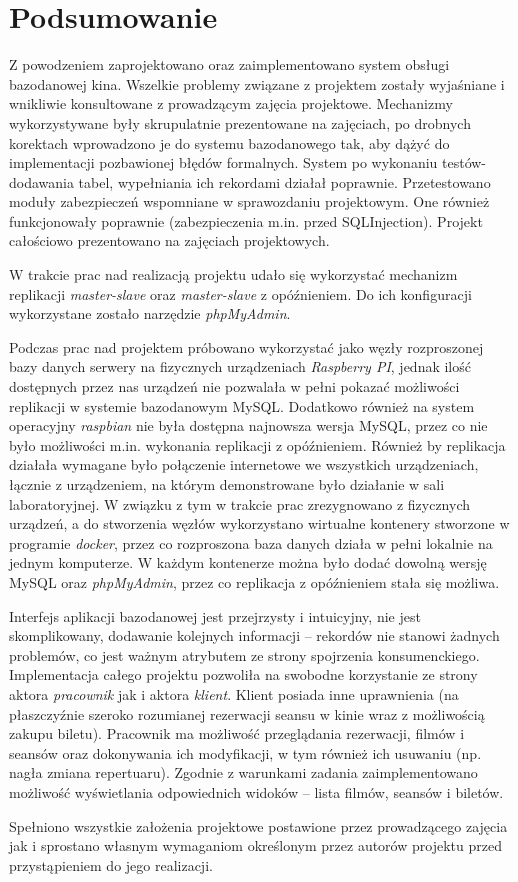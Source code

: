\chapter{Podsumowanie}

Z powodzeniem zaprojektowano oraz zaimplementowano system obsługi bazodanowej kina.
Wszelkie problemy związane z projektem zostały wyjaśniane i wnikliwie konsultowane z prowadzącym
zajęcia projektowe. Mechanizmy wykorzystywane były skrupulatnie prezentowane na zajęciach,
po drobnych korektach wprowadzono je do systemu bazodanowego tak, aby dążyć do
implementacji pozbawionej błędów formalnych.
System po wykonaniu testów- dodawania tabel, wypełniania ich rekordami działał poprawnie.
Przetestowano moduły zabezpieczeń wspomniane w sprawozdaniu projektowym. One również
funkcjonowały poprawnie (zabezpieczenia m.in. przed SQLInjection). Projekt całościowo prezentowano na zajęciach projektowych.

W trakcie prac nad realizacją projektu udało się wykorzystać mechanizm replikacji \textit{master-slave} oraz \textit{master-slave} z opóźnieniem. Do ich konfiguracji wykorzystane zostało narzędzie \textit{phpMyAdmin}. 

Podczas prac nad projektem próbowano wykorzystać jako węzły rozproszonej bazy danych serwery na fizycznych urządzeniach \textit{Raspberry PI}, jednak ilość dostępnych przez nas urządzeń nie pozwalała w pełni pokazać możliwości replikacji w systemie bazodanowym MySQL. Dodatkowo również na system operacyjny \textit{raspbian} nie była dostępna najnowsza wersja MySQL, przez co nie było możliwości m.in. wykonania replikacji z opóźnieniem. Również by replikacja działała wymagane było połączenie internetowe we wszystkich urządzeniach, łącznie z urządzeniem, na którym demonstrowane było działanie w sali laboratoryjnej. W związku z tym w trakcie prac zrezygnowano z fizycznych urządzeń, a do stworzenia węzłów wykorzystano wirtualne kontenery stworzone w programie \textit{docker}, przez co rozproszona baza danych działa w pełni lokalnie na jednym komputerze. W każdym kontenerze można było dodać dowolną wersję MySQL oraz \textit{phpMyAdmin}, przez co replikacja z opóźnieniem stała się możliwa.


Interfejs aplikacji bazodanowej jest przejrzysty i intuicyjny, nie jest skomplikowany, dodawanie kolejnych informacji – rekordów nie stanowi żadnych problemów, co jest ważnym atrybutem ze strony spojrzenia konsumenckiego. Implementacja całego projektu pozwoliła na swobodne korzystanie ze strony aktora \textit{pracownik} jak i aktora \textit{klient}. Klient posiada inne uprawnienia (na płaszczyźnie szeroko rozumianej rezerwacji seansu w kinie wraz z możliwością zakupu biletu). Pracownik ma możliwość przeglądania rezerwacji, filmów i seansów oraz dokonywania ich modyfikacji, w tym również ich usuwaniu (np. nagła zmiana repertuaru). Zgodnie z warunkami zadania zaimplementowano możliwość wyświetlania odpowiednich widoków – lista filmów, seansów i biletów.

Spełniono wszystkie założenia projektowe postawione przez prowadzącego zajęcia jak i sprostano własnym wymaganiom określonym przez autorów projektu przed przystąpieniem do jego realizacji.